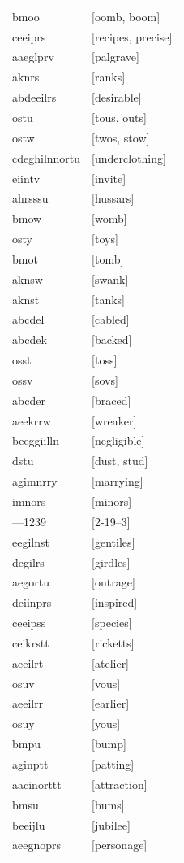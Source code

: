 \documentclass{article}
\begin{document}
\begin{tabular}{ll}
bmoo & [oomb, boom] \\
ceeiprs & [recipes, precise] \\
aaeglprv & [palgrave] \\
aknrs & [ranks] \\
abdeeilrs & [desirable] \\
ostu & [tous, outs] \\
ostw & [twos, stow] \\
cdeghilnnortu & [underclothing] \\
eiintv & [invite] \\
ahrsssu & [hussars] \\
bmow & [womb] \\
osty & [toys] \\
bmot & [tomb] \\
aknsw & [swank] \\
aknst & [tanks] \\
abcdel & [cabled] \\
abcdek & [backed] \\
osst & [toss] \\
ossv & [sovs] \\
abcder & [braced] \\
aeekrrw & [wreaker] \\
beeggiilln & [negligible] \\
dstu & [dust, stud] \\
agimnrry & [marrying] \\
imnors & [minors] \\
---1239 & [2-19--3] \\
eegilnst & [gentiles] \\
degilrs & [girdles] \\
aegortu & [outrage] \\
deiinprs & [inspired] \\
ceeipss & [species] \\
ceikrstt & [ricketts] \\
aeeilrt & [atelier] \\
osuv & [vous] \\
aeeilrr & [earlier] \\
osuy & [yous] \\
bmpu & [bump] \\
aginptt & [patting] \\
aacinorttt & [attraction] \\
bmsu & [bums] \\
beeijlu & [jubilee] \\
aeegnoprs & [personage] \\

\end{tabular}
\end{document}
